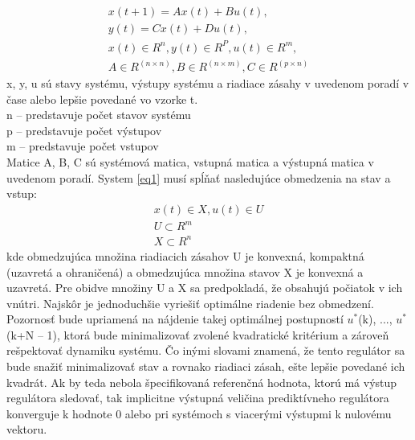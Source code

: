 \begin{equation} \label{eq1}
\begin{split}
x(t+1)=Ax(t)+Bu(t), \\
y(t)=Cx(t)+Du(t), \\
x(t)∈R^n, y(t)∈R^P, u(t)∈R^m, \\
A∈R^{(n×n)}, B∈R^{(n×m)}, C∈R^{(p×n)}
\end{split}
\end{equation}
x, y, u sú stavy systému, výstupy systému a riadiace zásahy v uvedenom poradí v čase alebo lepšie povedané vo vzorke t. \\
n – predstavuje počet stavov systému \\
p – predstavuje počet výstupov \\
m – predstavuje počet vstupov \\
Matice A, B, C sú systémová matica, vstupná matica a výstupná matica v uvedenom poradí. System \ref{eq1} musí spĺňať nasledujúce obmedzenia na stav a vstup:
\begin{equation} \label{eq2}
\begin{split}
x(t)∈X,u(t)∈U \\
U⊂R^m \\
X⊂R^n
\end{split}
\end{equation}
kde obmedzujúca množina riadiacich zásahov U je konvexná, kompaktná (uzavretá a ohraničená) a obmedzujúca množina stavov X je konvexná a uzavretá. Pre obidve množiny U a X sa predpokladá, že obsahujú počiatok v ich vnútri.\cite{MPC04}
Najskôr je jednoduchšie vyriešiť optimálne riadenie bez obmedzení. Pozornosť bude upriamená na nájdenie takej optimálnej postupností $u^*$(k), ..., $u^*$(k+N – 1), ktorá bude minimalizovať zvolené kvadratické kritérium a zároveň rešpektovať dynamiku systému. Čo inými slovami znamená, že tento regulátor sa bude snažiť minimalizovať stav a rovnako riadiaci zásah, ešte lepšie povedané ich kvadrát. Ak by teda nebola špecifikovaná referenčná hodnota, ktorú má výstup regulátora sledovať, tak implicitne výstupná veličina prediktívneho regulátora konverguje k hodnote 0 alebo pri systémoch s viacerými výstupmi k nulovému vektoru.\\

